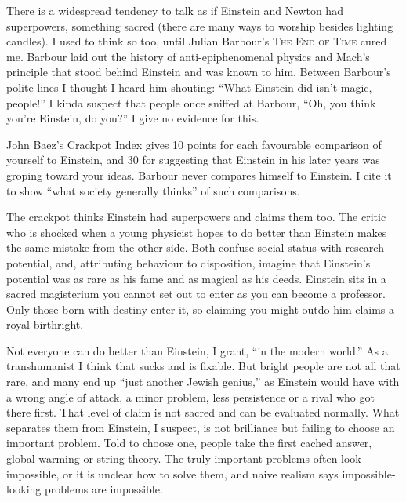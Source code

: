 
There is a widespread tendency to talk as if Einstein and Newton had superpowers, something sacred (there are many ways to worship besides lighting candles). I used to think so too, until Julian Barbour's \textsc{The End of Time} cured me. Barbour laid out the history of anti-epiphenomenal physics and Mach's principle that stood behind Einstein and was known to him. Between Barbour's polite lines I thought I heard him shouting: ``What Einstein did isn't magic, people!''  I kinda suspect that people once sniffed at Barbour, ``Oh, you think you're Einstein, do you?'' I give no evidence for this.

John Baez's Crackpot Index gives 10 points for each favourable comparison of yourself to Einstein, and 30 for suggesting that Einstein in his later years was groping toward your ideas. Barbour never compares himself to Einstein. I cite it to show ``what society generally thinks'' of such comparisons. 

The crackpot thinks Einstein had superpowers and claims them too. The critic who is shocked when a young physicist hopes to do better than Einstein makes the same mistake from the other side. Both confuse social status with research potential, and, attributing behaviour to disposition, imagine that Einstein's potential was as rare as his fame and as magical as his deeds. Einstein sits in a sacred magisterium you cannot set out to enter as you can become a professor. Only those born with destiny enter it, so claiming you might outdo him claims a royal birthright.

Not everyone can do better than Einstein, I grant, ``in the modern world.'' As a transhumanist I think that sucks and is fixable. But bright people are not all that rare, and many end up ``just another Jewish genius,'' as Einstein would have with a wrong angle of attack, a minor problem, less persistence or a rival who got there first. That level of claim is not sacred and can be evaluated normally. What separates them from Einstein, I suspect, is not brilliance but failing to choose an important problem. Told to choose one, people take the first cached answer, global warming or string theory. The truly important problems often look impossible, or it is unclear how to solve them, and naive realism says impossible-looking problems are impossible.

